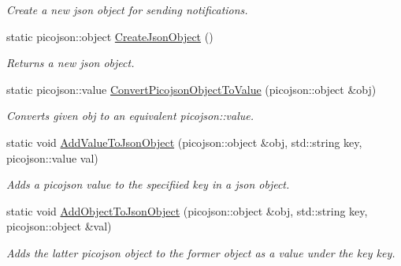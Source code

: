 \begin{DoxyCompactItemize}
\begin{DoxyCompactList}\small\item\em Create a new json object for sending notifications. \end{DoxyCompactList}\item 
\mbox{\label{classcsci3081_1_1JsonHelper_a58c0b129bcdd4f4fcbab655a47ab7a2b}} 
static picojson\+::object \hyperlink{classcsci3081_1_1JsonHelper_a58c0b129bcdd4f4fcbab655a47ab7a2b}{Create\+Json\+Object} ()
\begin{DoxyCompactList}\small\item\em Returns a new json object. \end{DoxyCompactList}\item 
\mbox{\label{classcsci3081_1_1JsonHelper_aa0ea9463bc5167423bac8ae271715933}} 
static picojson\+::value \hyperlink{classcsci3081_1_1JsonHelper_aa0ea9463bc5167423bac8ae271715933}{Convert\+Picojson\+Object\+To\+Value} (picojson\+::object \&obj)
\begin{DoxyCompactList}\small\item\em Converts given obj to an equivalent picojson\+::value. \end{DoxyCompactList}\item 
\mbox{\label{classcsci3081_1_1JsonHelper_a49238200fde32b3d4903d52cf247145e}} 
static void \hyperlink{classcsci3081_1_1JsonHelper_a49238200fde32b3d4903d52cf247145e}{Add\+Value\+To\+Json\+Object} (picojson\+::object \&obj, std\+::string key, picojson\+::value val)
\begin{DoxyCompactList}\small\item\em Adds a picojson value to the specifiied key in a json object. \end{DoxyCompactList}\item 
\mbox{\label{classcsci3081_1_1JsonHelper_a794297b781172a2d46f12e978c7cc8cc}} 
static void \hyperlink{classcsci3081_1_1JsonHelper_a794297b781172a2d46f12e978c7cc8cc}{Add\+Object\+To\+Json\+Object} (picojson\+::object \&obj, std\+::string key, picojson\+::object \&val)
\begin{DoxyCompactList}\small\item\em Adds the latter picojson object to the former object as a value under the key \textquotesingle{}key\textquotesingle{}. \end{DoxyCompactList}\item 

\end{DoxyCompactItemize}
